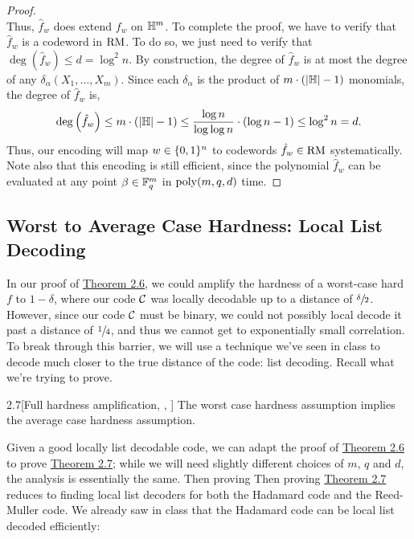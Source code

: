\documentclass[11pt]{article}
\begin{document}
\begin{proof}
\begin{equation*}
    \end{equation*}
    Thus, $\hat{f}_w$ does extend $f_w$ on $\mathbb{H}^m$. To complete the proof, we have to verify that $\hat{f}_w$ is a codeword in $\mathrm{RM}$. To do so, we just need to verify that $\deg(\hat{f}_w) \leq d = \log^2 n$. By construction, the degree of $\hat{f}_w$ is at most the degree of any $\delta_\alpha(X_1, \ldots, X_m)$. Since each $\delta_\alpha$ is the product of $m \cdot (|\mathbb{H}| - 1)$ monomials, the degree of $\hat{f}_w$ is,
    \begin{equation*}
        \deg \left(\hat{f}_w\right) \leq m \cdot (|\mathbb{H}| - 1) \leq \frac{\log n}{\log \log n} \cdot \left(\log n - 1\right) \leq \log^2 n = d.
    \end{equation*}
    Thus, our encoding will map $w \in \{0, 1\}^n$ to codewords $\hat{f}_w \in \mathrm{RM}$ systematically. Note also that this encoding is still efficient, since the polynomial $\hat{f}_w$ can be evaluated at any point $\beta \in \mathbb{F}_q^m$ in $\mathrm{poly}(m, q, d)$ time.
\end{proof}

\subsection{Worst to Average Case Hardness: Local List Decoding}

In our proof of \hyperref[t-2-6]{Theorem 2.6}, we could amplify the hardness of a worst-case hard $f$ to $1 - \delta$, where our code $\mathcal{C}$ was locally decodable up to a distance of $\sfrac{\delta}{2}$. However, since our code $\mathcal{C}$ must be binary, we could not possibly local decode it past a distance of $\sfrac{1}{4}$, and thus we cannot get to exponentially small correlation. To break through this barrier, we will use a technique we've seen in class to decode much closer to the true distance of the code: list decoding. Recall what we're trying to prove.

\begin{theorem}{2.7}[Full hardness amplification, \cite{iw97}, \cite{STV99}]\label{t-2-7}
    The worst case hardness assumption implies the average case hardness assumption.
\end{theorem}

Given a good locally list decodable code, we can adapt the proof of \hyperref[t-2-6]{Theorem 2.6} to prove \hyperref[t-2-7]{Theorem 2.7}; while we will need slightly different choices of $m$, $q$ and $d$, the analysis is essentially the same. Then proving Then proving \hyperref[t-2-7]{Theorem 2.7} reduces to finding local list decoders for both the Hadamard code and the Reed-Muller code. We already saw in class that the Hadamard code can be local list decoded efficiently:
\end{document}
